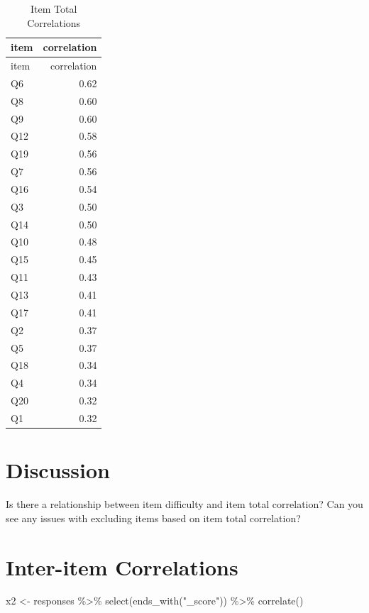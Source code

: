 \documentclass[
  letterpaper,
  DIV=11,
  numbers=noendperiod]{scrreprt}
\newenvironment{Shaded}{\begin{snugshade}}{\end{snugshade}}
\newcommand{\FunctionTok}[1]{\textcolor[rgb]{0.28,0.35,0.67}{#1}}
\newcommand{\NormalTok}[1]{\textcolor[rgb]{0.00,0.23,0.31}{#1}}
\newcommand{\OtherTok}[1]{\textcolor[rgb]{0.00,0.23,0.31}{#1}}
\newcommand{\SpecialCharTok}[1]{\textcolor[rgb]{0.37,0.37,0.37}{#1}}
\newcommand{\StringTok}[1]{\textcolor[rgb]{0.13,0.47,0.30}{#1}}
\begin{document}
\hypertarget{tbl-itemr}{}
\begin{longtable}[]{@{}lr@{}}
\caption{\label{tbl-itemr}Item Total Correlations}\tabularnewline
\toprule\noalign{}
item & correlation \\
\midrule\noalign{}
\endfirsthead
\toprule\noalign{}
item & correlation \\
\midrule\noalign{}
\endhead
\bottomrule\noalign{}
\endlastfoot
Q6 & 0.62 \\
Q8 & 0.60 \\
Q9 & 0.60 \\
Q12 & 0.58 \\
Q19 & 0.56 \\
Q7 & 0.56 \\
Q16 & 0.54 \\
Q3 & 0.50 \\
Q14 & 0.50 \\
Q10 & 0.48 \\
Q15 & 0.45 \\
Q11 & 0.43 \\
Q13 & 0.41 \\
Q17 & 0.41 \\
Q2 & 0.37 \\
Q5 & 0.37 \\
Q18 & 0.34 \\
Q4 & 0.34 \\
Q20 & 0.32 \\
Q1 & 0.32 \\
\end{longtable}

\hypertarget{discussion}{%
\section{Discussion}\label{discussion}}

Is there a relationship between item difficulty and item total
correlation? Can you see any issues with excluding items based on item
total correlation?

\hypertarget{inter-item-correlations}{%
\section{Inter-item Correlations}\label{inter-item-correlations}}

\begin{Shaded}
\begin{Highlighting}[]
\NormalTok{x2 }\OtherTok{\textless{}{-}}\NormalTok{ responses }\SpecialCharTok{\%\textgreater{}\%} 
  \FunctionTok{select}\NormalTok{(}\FunctionTok{ends\_with}\NormalTok{(}\StringTok{"\_score"}\NormalTok{)) }\SpecialCharTok{\%\textgreater{}\%}
  \FunctionTok{correlate}\NormalTok{()}
\end{Highlighting}
\end{Shaded}
\end{document}
